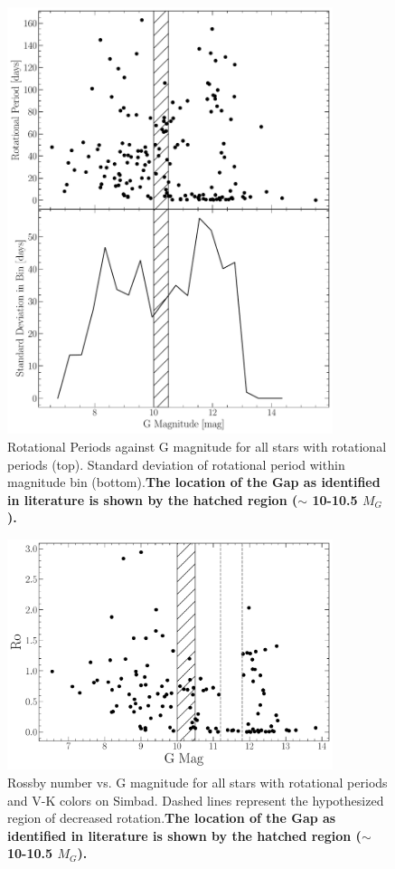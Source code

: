 \begin{figure}
  \centering
  \includegraphics[width=0.85\textwidth]{figures/jaoMagActivity/RotationSignifigance.pdf}
  \caption{Rotational Periods against G magnitude for all stars with rotational
  periods (top). Standard deviation of rotational period within magnitude bin (bottom).\textbf{The location of the Gap
  as identified in literature is shown by the hatched region ($\sim$ 10-10.5 $M_{G}$).}}
  \label{fig:rotationalSignifigance}
\end{figure}

\begin{figure}
  \centering
  \includegraphics[width=0.85\textwidth]{figures/jaoMagActivity/Rossby.pdf}
  \caption{Rossby number vs. G magnitude for all stars with rotational periods
  and V-K colors on Simbad. Dashed lines represent the hypothesized region of decreased rotation.\textbf{The location of the Gap
  as identified in literature is shown by the hatched region ($\sim$ 10-10.5 $M_{G}$).}}
  \label{fig:rossby}
\end{figure}


